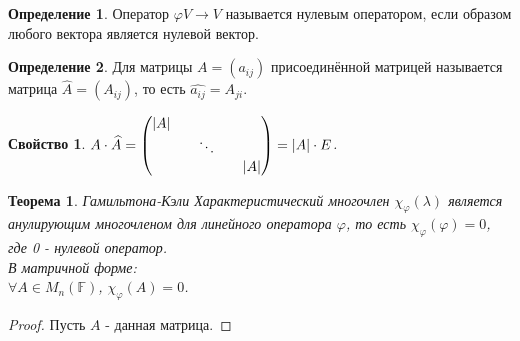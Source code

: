 \documentclass[a4paper, 12pt]{article}
\newcommand{\F}{\mathbb F}
\renewcommand{\phi}{\varphi}
\theoremstyle{definition}
\newtheorem*{definition}{Определение}
\theoremstyle{plain}
\newtheorem*{theorem}{Теорема}
\newtheorem*{properties1}{Свойство}
\theoremstyle{remark}
\begin{document}
  \begin{definition}
    Оператор $\phi V \to V$ называется нулевым оператором, если образом любого вектора является нулевой вектор.
  \end{definition}
  \begin{definition}
    Для матрицы $A = (a_{ij})$ присоединённой матрицей называется матрица $\widehat{A} = (A_{ij})$, то есть $\widehat{a_{ij}} = A_{ji}$.
  \end{definition}
  \begin{properties1}
    $A\cdot\widehat{A} = \begin{pmatrix}
      |A|\\
      \null && \ddots\\
      \null && \null && |A|
    \end{pmatrix} = |A|\cdot E$.
  \end{properties1}
  \begin{theorem} Гамильтона-Кэли
    Характеристический многочлен $\chi_{\phi}(\lambda)$ является анулирующим многочленом для линейного оператора $\phi$, то есть $\chi_{\phi}(\phi) = 0$, где 0 - нулевой оператор.\\
    В матричной форме:\\
    $\forall A\in M_n(\F)$, $\chi_{\phi}(A) = 0$.
  \end{theorem}
  \begin{proof}
    Пусть $A$ - данная матрица.
  \end{proof}
\end{document}
